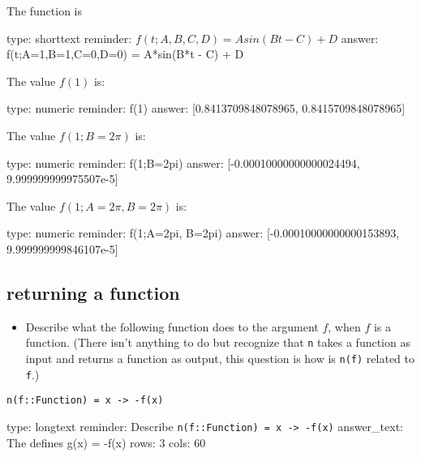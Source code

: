 \documentclass[12pt]{article}
\begin{document}
The function is

\begin{answer}
type: shorttext
reminder: \(f(t;A,B,C,D) = Asin(Bt - C) + D \)
answer: f(t;A=1,B=1,C=0,D=0) = A*sin(B*t - C) + D

\end{answer}

The value $f(1)$ is:

\begin{answer}
    type: numeric
    reminder: f(1)
    answer: [0.8413709848078965, 0.8415709848078965]

\end{answer}

The value $f(1; B=2\pi)$ is:

\begin{answer}
    type: numeric
    reminder: f(1;B=2pi)
    answer: [-0.00010000000000024494, 9.999999999975507e-5]

\end{answer}

The value $f(1; A=2\pi, B=2\pi)$ is:

\begin{answer}
    type: numeric
    reminder: f(1;A=2pi, B=2pi)
    answer: [-0.00010000000000153893, 9.999999999846107e-5]

\end{answer}

\subsection{returning a function}

\begin{itemize}
\itemsep1pt\parskip0pt
\item
  Describe what the following function does to the argument $f$, when
  $f$ is a function. (There isn't anything to do but recognize that
  \texttt{n} takes a function as input and returns a function as output,
  this question is how is \texttt{n(f)} related to \texttt{f}.)
\end{itemize}



\begin{verbatim}
n(f::Function) = x -> -f(x)
\end{verbatim}
\begin{answer}
type: longtext
reminder: Describe \verb+n(f::Function) = x -> -f(x)+
answer_text: The defines g(x) = -f(x) 
rows: 3
cols: 60
\end{answer}
\end{document}
